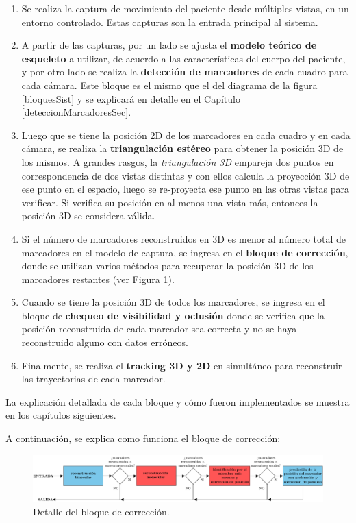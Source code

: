 \begin{enumerate}
\item Se realiza la captura de movimiento del paciente desde múltiples vistas, en un entorno controlado. Estas capturas son la entrada principal al sistema.
\item A partir de las capturas, por un lado se ajusta el \textbf{modelo teórico de esqueleto} a utilizar, de acuerdo a las características del cuerpo del paciente, y por otro lado se realiza la \textbf{detección de marcadores} de cada cuadro para cada cámara. Este bloque es el mismo que el del diagrama de la figura \ref{bloquesSist} y se explicará en detalle en el Capítulo \ref{deteccionMarcadoresSec}.
\item Luego que se tiene la posición 2D de los marcadores en cada cuadro y en cada cámara, se realiza la \textbf{triangulación estéreo} para obtener la posición 3D de los mismos. A grandes rasgos, la \emph{triangulación 3D} empareja dos puntos en correspondencia de dos vistas distintas y con ellos calcula la proyección 3D de ese punto en el espacio, luego se re-proyecta ese punto en las otras vistas para verificar. Si verifica su posición en al menos una vista más, entonces la posición 3D se considera válida.
\item Si el número de marcadores reconstruidos en 3D es menor al número total de marcadores en el modelo de captura, se ingresa en el \textbf{bloque de corrección}, donde se utilizan varios métodos para recuperar la posición 3D de los marcadores restantes (ver Figura \ref{fig:bloqCorr}). 
\item Cuando se tiene la posición 3D de todos los marcadores, se ingresa en el bloque de \textbf{chequeo de visibilidad y oclusión} donde se verifica que la posición reconstruida de cada marcador sea correcta y no se haya reconstruido alguno con datos erróneos.
\item Finalmente, se realiza el \textbf{tracking 3D y 2D} en simultáneo para reconstruir las trayectorias de cada marcador.
\end{enumerate}

La explicación detallada de cada bloque y cómo fueron implementados se muestra en los capítulos siguientes.

A continuación, se explica como funciona el bloque de corrección:

\begin{figure}[ht!]
\hspace{-1cm}
\includegraphics[scale=0.22]{img/Sistema_completo/BloquesDeCorreccion}
\caption{Detalle del bloque de corrección.}
\label{fig:bloqCorr}
\end{figure}


